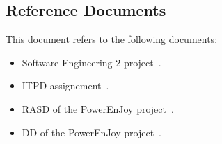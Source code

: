 \subsection{Reference Documents}

This document refers to the following documents:
\begin{itemize}
	\item Software Engineering 2 project~\cite{se-project-rules}.
	\item ITPD assignement~\cite{se-itpd}.
	\item RASD of the PowerEnJoy project~\cite{power-rasd}.
	\item DD of the PowerEnJoy project~\cite{power-dd}.
\end{itemize}


